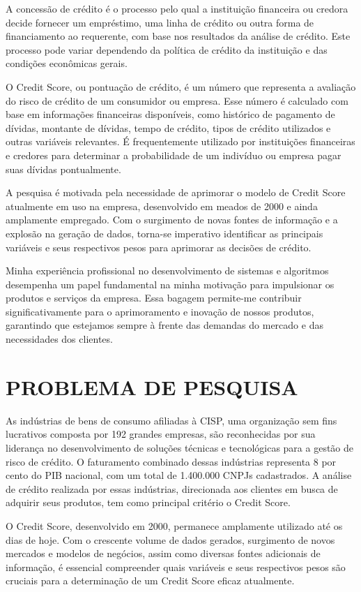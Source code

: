 \documentclass[12pt,a4paper]{article}
\begin{document}
A concessão de crédito é o processo pelo qual a instituição financeira ou credora decide fornecer um empréstimo, uma linha de crédito ou outra forma de financiamento ao requerente, com base nos resultados da análise de crédito. Este processo pode variar dependendo da política de crédito da instituição e das condições econômicas gerais.

O Credit Score, ou pontuação de crédito, é um número que representa a avaliação do risco de crédito de um consumidor ou empresa. Esse número é calculado com base em informações financeiras disponíveis, como histórico de pagamento de dívidas, montante de dívidas, tempo de crédito, tipos de crédito utilizados e outras variáveis relevantes. É frequentemente utilizado por instituições financeiras e credores para determinar a probabilidade de um indivíduo ou empresa pagar suas dívidas pontualmente. 

A pesquisa é motivada pela necessidade de aprimorar o modelo de Credit Score atualmente em uso na empresa, desenvolvido em meados de 2000 e ainda amplamente empregado. Com o surgimento de novas fontes de informação e a explosão na geração de dados, torna-se imperativo identificar as principais variáveis e seus respectivos pesos para aprimorar as decisões de crédito. 

Minha experiência profissional no desenvolvimento de sistemas e algoritmos desempenha um papel fundamental na minha motivação para impulsionar os produtos e serviços da empresa. Essa bagagem permite-me contribuir significativamente para o aprimoramento e inovação de nossos produtos, garantindo que estejamos sempre à frente das demandas do mercado e das necessidades dos clientes.
\section{PROBLEMA DE PESQUISA}
As indústrias de bens de consumo afiliadas à CISP, uma organização sem fins lucrativos composta por 192 grandes empresas, são reconhecidas por sua liderança no desenvolvimento de soluções técnicas e tecnológicas para a gestão de risco de crédito. O faturamento combinado dessas indústrias representa 8 por cento do PIB nacional, com um total de 1.400.000 CNPJs cadastrados. A análise de crédito realizada por essas indústrias, direcionada aos clientes em busca de adquirir seus produtos, tem como principal critério o Credit Score.

O Credit Score, desenvolvido em 2000, permanece amplamente utilizado até os dias de hoje. Com o crescente volume de dados gerados, surgimento de novos mercados e modelos de negócios, assim como diversas fontes adicionais de informação, é essencial compreender quais variáveis e seus respectivos pesos são cruciais para a determinação de um Credit Score eficaz atualmente.
\end{document}
